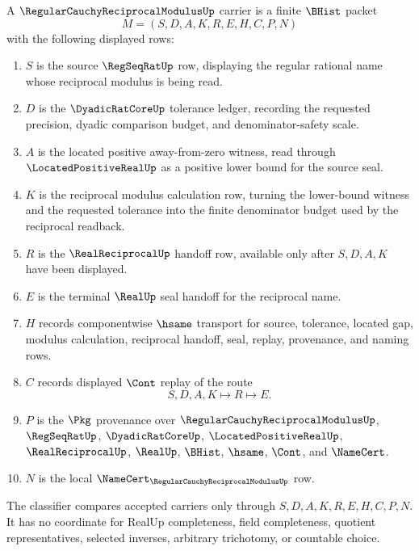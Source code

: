 \begin{definition}
\label{def:regular-cauchy-reciprocal-modulus-carrier}
A $\RegularCauchyReciprocalModulusUp$ carrier is a finite $\BHist$ packet
$$
M=(S,D,A,K,R,E,H,C,P,N)
$$
with the following displayed rows:
\begin{enumerate}
\item $S$ is the source $\RegSeqRatUp$ row, displaying the regular rational name whose reciprocal modulus is being read.
\item $D$ is the $\DyadicRatCoreUp$ tolerance ledger, recording the requested precision, dyadic comparison budget, and denominator-safety scale.
\item $A$ is the located positive away-from-zero witness, read through $\LocatedPositiveRealUp$ as a positive lower bound for the source seal.
\item $K$ is the reciprocal modulus calculation row, turning the lower-bound witness and the requested tolerance into the finite denominator budget used by the reciprocal readback.
\item $R$ is the $\RealReciprocalUp$ handoff row, available only after $S,D,A,K$ have been displayed.
\item $E$ is the terminal $\RealUp$ seal handoff for the reciprocal name.
\item $H$ records componentwise $\hsame$ transport for source, tolerance, located gap, modulus calculation, reciprocal handoff, seal, replay, provenance, and naming rows.
\item $C$ records displayed $\Cont$ replay of the route
$$
S,D,A,K \longmapsto R \longmapsto E .
$$
\item $P$ is the $\Pkg$ provenance over $\RegularCauchyReciprocalModulusUp$, $\RegSeqRatUp$, $\DyadicRatCoreUp$, $\LocatedPositiveRealUp$, $\RealReciprocalUp$, $\RealUp$, $\BHist$, $\hsame$, $\Cont$, and $\NameCert$.
\item $N$ is the local $\NameCert_{\RegularCauchyReciprocalModulusUp}$ row.
\end{enumerate}
The classifier compares accepted carriers only through $S,D,A,K,R,E,H,C,P,N$. It has no coordinate for RealUp completeness, field completeness, quotient representatives, selected inverses, arbitrary trichotomy, or countable choice.
\end{definition}


